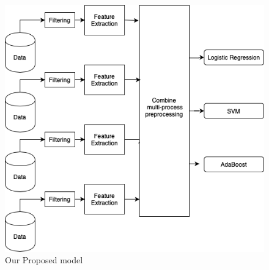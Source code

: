 \begin{figure}[b]
    \centering
    \includegraphics[width=\columnwidth]{tex/figures/model.png}
    \caption{Our Proposed model}
    \label{fig:model}
\end{figure}
